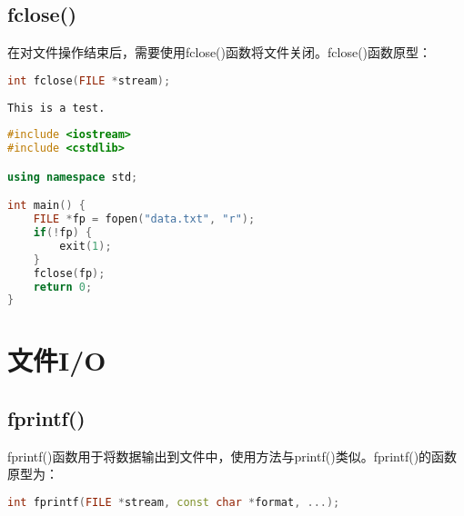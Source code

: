 \vspace{0.5cm}

\subsection{fclose()}

在对文件操作结束后，需要使用fclose()函数将文件关闭。fclose()函数原型：

\vspace{-0.5cm}

\begin{lstlisting}[language=C++]
int fclose(FILE *stream);
\end{lstlisting}

\vspace{0.5cm}


\begin{lstlisting}[title=data.txt]
This is a test.
\end{lstlisting}

\begin{lstlisting}[language=C++]
#include <iostream>
#include <cstdlib>

using namespace std;

int main() {
    FILE *fp = fopen("data.txt", "r");
    if(!fp) {
        exit(1);
    }
    fclose(fp);
    return 0;
}
\end{lstlisting}

\newpage

\section{文件I/O}

\subsection{fprintf()}

fprintf()函数用于将数据输出到文件中，使用方法与printf()类似。fprintf()的函数原型为：

\vspace{-0.5cm}

\begin{lstlisting}[language=C++]
int fprintf(FILE *stream, const char *format, ...);
\end{lstlisting}

\vspace{0.5cm}


